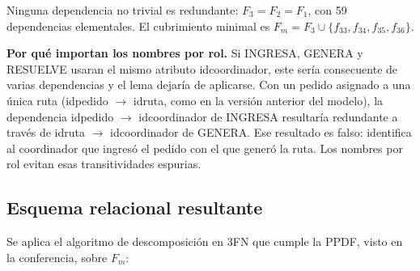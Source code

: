 \documentclass[11pt,a4paper]{article}
\newcommand{\ubrk}{\textunderscore\allowbreak}
\newcommand{\campo}[1]{\textnormal{\ttfamily\let\_\ubrk #1}}
\begin{document}
Ninguna dependencia no trivial es redundante: $F_3 = F_2 = F_1$, con 59 dependencias elementales. El cubrimiento minimal es $F_m = F_3 \cup \{f_{33}, f_{34}, f_{35}, f_{36}\}$.

\textbf{Por qué importan los nombres por rol.} Si INGRESA, GENERA y RESUELVE usaran el mismo atributo \campo{id\_coordinador}, este sería consecuente de varias dependencias y el lema dejaría de aplicarse. Con un pedido asignado a una única ruta (\campo{id\_pedido} $\rightarrow$ \campo{id\_ruta}, como en la versión anterior del modelo), la dependencia \campo{id\_pedido} $\rightarrow$ \campo{id\_coordinador} de INGRESA resultaría redundante a través de \campo{id\_ruta} $\rightarrow$ \campo{id\_coordinador} de GENERA. Ese resultado es falso: identifica al coordinador que ingresó el pedido con el que generó la ruta. Los nombres por rol evitan esas transitividades espurias.

\subsection{Esquema relacional resultante}\label{sec:esquema}

Se aplica el algoritmo de descomposición en 3FN que cumple la PPDF, visto en la conferencia, sobre $F_m$:
\end{document}
